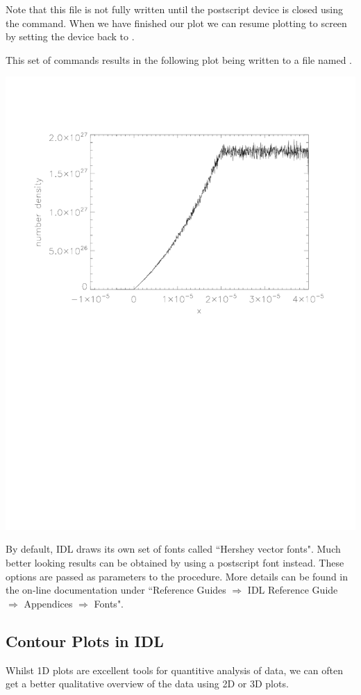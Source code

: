  Note that this file is not fully written until the postscript device is
  closed using the  command. When we have finished our
  plot we can resume plotting to screen by setting the device back to .


  This set of commands results in the following plot being written to
  a file named .
  \begin{center}
    \includegraphics[width=0.8\linewidth]{images/idl_ps_plot}
  \end{center}
  By default, IDL draws its own set of fonts called ``Hershey vector fonts".
  Much better looking results can be obtained by using a postscript font
  instead. These options are passed as parameters to the 
  procedure. More details can be found in the on-line documentation under
  ``Reference Guides $\Rightarrow$ IDL Reference Guide $\Rightarrow$
  Appendices $\Rightarrow$ Fonts".

\subsection{Contour Plots in IDL}
  Whilst 1D plots are excellent tools for quantitive analysis of data,
  we can often get a better qualitative overview of the data using 2D
  or 3D plots.


